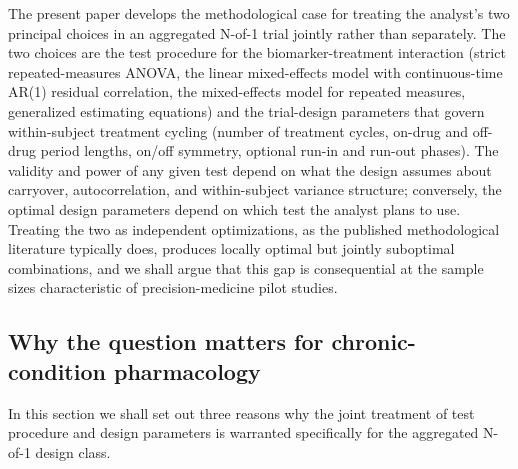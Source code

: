 \documentclass[
  11pt,
]{article}
\begin{document}
The present paper develops the methodological case for treating
the analyst's two principal choices in an aggregated N-of-1 trial
jointly rather than separately. The two choices are the test
procedure for the biomarker-treatment interaction (strict
repeated-measures ANOVA, the linear mixed-effects model with
continuous-time AR(1) residual correlation, the mixed-effects
model for repeated measures, generalized estimating equations)
and the trial-design parameters that govern within-subject
treatment cycling (number of treatment cycles, on-drug and
off-drug period lengths, on/off symmetry, optional run-in and
run-out phases). The validity and power of any given test depend
on what the design assumes about carryover, autocorrelation, and
within-subject variance structure; conversely, the optimal design
parameters depend on which test the analyst plans to use.
Treating the two as independent optimizations, as the published
methodological literature typically does, produces locally optimal
but jointly suboptimal combinations, and we shall argue that this
gap is consequential at the sample sizes characteristic of
precision-medicine pilot studies.

\subsection{Why the question matters for chronic-condition pharmacology}\label{why-the-question-matters-for-chronic-condition-pharmacology}

In this section we shall set out three reasons why the joint
treatment of test procedure and design parameters is warranted
specifically for the aggregated N-of-1 design class.
\end{document}
